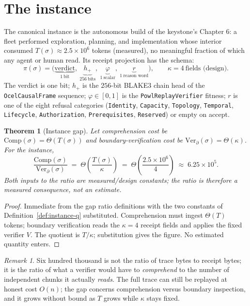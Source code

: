 \documentclass[11pt,oneside]{book}
\theoremstyle{definition}
\theoremstyle{plain}
\newtheorem{theorem}{Theorem}[chapter]
\theoremstyle{remark}
\newtheorem*{remark}{Remark}
\newcommand{\Proj}{\pi}                        %
\newcommand{\CL}{\kappa}                       %
\newcommand{\Fitness}{\varphi}
\newcommand{\code}[1]{\texttt{#1}}
\begin{document}
\section{The instance}
The canonical instance is the autonomous build of the keystone's Chapter 6: a fleet performed exploration, planning, and implementation whose interior consumed $T(\sigma)\approx2.5\times 10^{6}$ tokens (measured), no meaningful fraction of which any agent or human read. %
Its receipt projection has the schema:
\[
\Proj(\sigma)=\bigl(\underbrace{\text{verdict}}_{1\ \text{bit}},\ \underbrace{h_{+}}_{256\ \text{bits}},\ \underbrace{\Fitness}_{1\ \text{scalar}},\ \underbrace{r}_{1\ \text{reason word}}\bigr),
\qquad \CL=4\ \text{fields (design).}
\]
The verdict is one bit; $h_{+}$ is the $256$-bit BLAKE3 chain head of the \code{OcelCausalFrame} sequence; $\Fitness\in[0,1]$ is the \code{PowlReplayVerifier} fitness; $r$ is one of the eight refusal categories (\code{Identity}, \code{Capacity}, \code{Topology}, \code{Temporal}, \code{Lifecycle}, \code{Authorization}, \code{Prerequisites}, \code{Reserved}) or empty on accept. %

\begin{theorem}[Instance gap]\label{thm:instance-gap}
Let comprehension cost be $\mathrm{Comp}(\sigma)=\Theta(T(\sigma))$ and boundary-verification cost be $\mathrm{Ver}_\partial(\sigma)=\Theta(\CL)$. For the instance,
\[
\frac{\mathrm{Comp}(\sigma)}{\mathrm{Ver}_\partial(\sigma)}
\;=\;\Theta\!\left(\frac{T(\sigma)}{\CL}\right)
\;=\;\Theta\!\left(\frac{2.5\times 10^{6}}{4}\right)
\;\approx\;6.25\times 10^{5}.
\]
Both inputs to the ratio are measured/design constants; the ratio is therefore a measured consequence, not an estimate. %
\end{theorem}

\begin{proof}
Immediate from the gap ratio definitions with the two constants of Definition~\ref{def:instance-q} substituted. %
Comprehension must ingest $\Theta(T)$ tokens; boundary verification reads the $\CL=4$ receipt fields and applies the fixed verifier $V$. %
The quotient is $T/\CL$; substitution gives the figure. %
No estimated quantity enters. %
\end{proof}

\begin{remark}
Six hundred thousand is not the ratio of trace bytes to receipt bytes; it is the ratio of what a verifier would have to \emph{comprehend} to the number of independent chunks it actually \emph{reads}. %
The full trace can still be replayed at honest cost $O(n)$; the gap concerns comprehension versus boundary inspection, and it grows without bound as $T$ grows while $\CL$ stays fixed. %
\end{remark}
\end{document}
